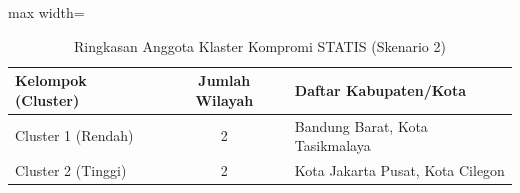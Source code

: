 \begin{table}[H]
\centering
\caption{Ringkasan Anggota Klaster Kompromi STATIS (Skenario 2)} \label{tab:sample2compromclust}
\begin{adjustbox}{max width=\textwidth}
\begin{tabular}{|p{3cm}|c|p{10cm}|}
\hline
\textbf{Kelompok (Cluster)} & \textbf{Jumlah Wilayah} & \textbf{Daftar Kabupaten/Kota} \\
\hline
Cluster 1 (Rendah) & 2 & Bandung Barat, Kota Tasikmalaya \\
\hline
Cluster 2 (Tinggi) & 2 & Kota Jakarta Pusat, Kota Cilegon \\
\hline
\end{tabular}
\end{adjustbox}
\end{table}
